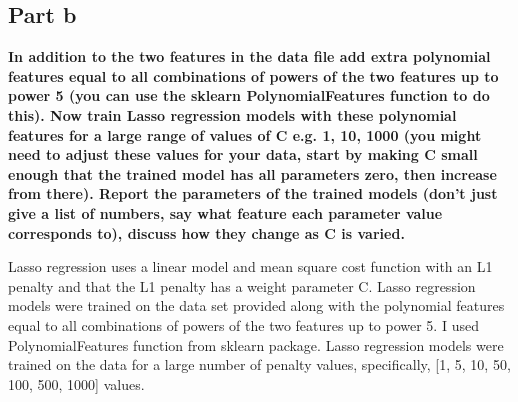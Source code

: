 \documentclass[10pt]{article}
\begin{document}
\subsection*{Part b}
\textbf{In addition to the two features in the data file add extra polynomial features
  equal to all combinations of powers of the two features up to power 5 (you
  can use the sklearn PolynomialFeatures function to do this). Now train Lasso
  regression models with these polynomial features for a large range of values of
  C e.g. 1, 10, 1000 (you might need to adjust these values for your data, start
  by making C small enough that the trained model has all parameters zero, then
  increase from there). Report the parameters of the trained models (don't just
  give a list of numbers, say what feature each parameter value corresponds to),
  discuss how they change as C is varied.}

Lasso regression uses a linear model and mean square cost function with an L1 penalty
and that the L1 penalty has a weight parameter C. Lasso regression models were trained
on the data set provided along with the polynomial features equal to all combinations of
powers of the two features up to power 5. I used PolynomialFeatures function from sklearn package.
Lasso regression models were trained on the data for a large number of penalty values, specifically,
[1, 5, 10, 50, 100, 500, 1000] values.
\end{document}
